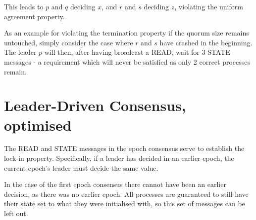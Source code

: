 \documentclass[a4paper]{scrreprt}
\begin{document}
This leads to $p$ and $q$ deciding $x$, and $r$ and $s$ deciding $z$, violating
the uniform agreement property.

As an example for violating the termination property if the quorum size remains
untouched, simply consider the case where $r$ and $s$ have crashed in the
beginning. The leader $p$ will then, after having broadcast a READ, wait for 3
STATE messages - a requirement which will never be satisfied as only 2 correct
processes remain.

\section{Leader-Driven Consensus, optimised}

The READ and STATE messages in the epoch consensus serve to establish the
lock-in property. Specifically, if a leader has decided in an earlier epoch, the
current epoch's leader must decide the same value.

In the case of the first epoch consensus there cannot have been an earlier
decision, as there was no earlier epoch. All processes are guaranteed to still
have their state set to what they were initialised with, so this set of
messages can be left out.
\end{document}
